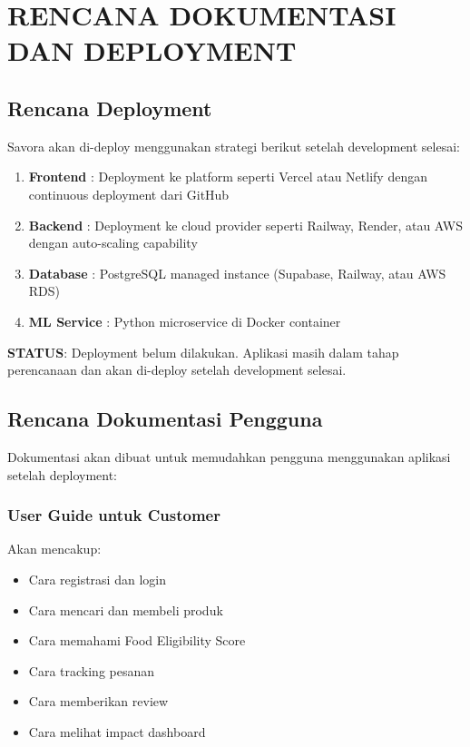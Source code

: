 \section{RENCANA DOKUMENTASI DAN DEPLOYMENT}

\subsection{Rencana Deployment}

Savora akan di-deploy menggunakan strategi berikut setelah development selesai:

\begin{enumerate}[leftmargin=*]
    \item \textbf{Frontend} : Deployment ke platform seperti Vercel atau Netlify dengan continuous deployment dari GitHub
    \item \textbf{Backend} : Deployment ke cloud provider seperti Railway, Render, atau AWS dengan auto-scaling capability
    \item \textbf{Database} : PostgreSQL managed instance (Supabase, Railway, atau AWS RDS)
    \item \textbf{ML Service} : Python microservice di Docker container
\end{enumerate}

\textbf{STATUS}: Deployment belum dilakukan. Aplikasi masih dalam tahap perencanaan dan akan di-deploy setelah development selesai.

\subsection{Rencana Dokumentasi Pengguna}

Dokumentasi akan dibuat untuk memudahkan pengguna menggunakan aplikasi setelah deployment:

\subsubsection{User Guide untuk Customer}
Akan mencakup:
\begin{itemize}[leftmargin=*]
    \item Cara registrasi dan login
    \item Cara mencari dan membeli produk
    \item Cara memahami Food Eligibility Score
    \item Cara tracking pesanan
    \item Cara memberikan review
    \item Cara melihat impact dashboard
\end{itemize}

